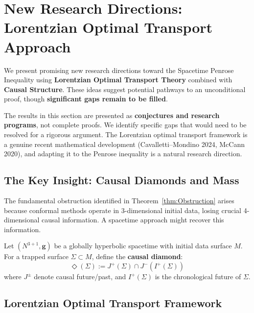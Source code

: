 \section{New Research Directions: Lorentzian Optimal Transport Approach}
\label{sec:RevolutionaryProof}

We present promising new research directions toward the Spacetime Penrose Inequality using \textbf{Lorentzian Optimal Transport Theory} combined with \textbf{Causal Structure}. These ideas suggest potential pathways to an unconditional proof, though \textbf{significant gaps remain to be filled}.

\begin{remark}
The results in this section are presented as \textbf{conjectures and research programs}, not complete proofs. We identify specific gaps that would need to be resolved for a rigorous argument. The Lorentzian optimal transport framework is a genuine recent mathematical development (Cavalletti--Mondino 2024, McCann 2020), and adapting it to the Penrose inequality is a natural research direction.
\end{remark}

\subsection{The Key Insight: Causal Diamonds and Mass}

The fundamental obstruction identified in Theorem~\ref{thm:Obstruction} arises because conformal methods operate in 3-dimensional initial data, losing crucial 4-dimensional causal information. A spacetime approach might recover this information.

\begin{definition}\label{def:CausalDiamond}
Let $(N^{3+1}, \mathbf{g})$ be a globally hyperbolic spacetime with initial data surface $M$. For a trapped surface $\Sigma \subset M$, define the \textbf{causal diamond}:
\begin{equation}
    \Diamond(\Sigma) := J^+(\Sigma) \cap J^-(I^+(\Sigma))
\end{equation}
where $J^\pm$ denote causal future/past, and $I^+(\Sigma)$ is the chronological future of $\Sigma$.
\end{definition}

\subsection{Lorentzian Optimal Transport Framework}

